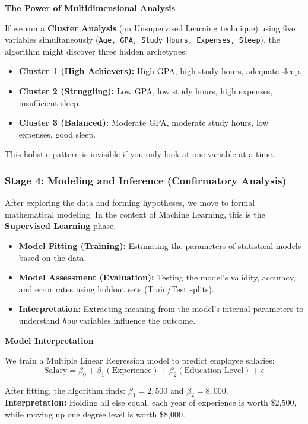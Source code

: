 \vspace{0.1cm}
\begin{example}{\textbf{The Power of Multidimensional Analysis}}

If we run a \textbf{Cluster Analysis} (an Unsupervised Learning technique) using five variables simultaneously (\texttt{Age, GPA, Study Hours, Expenses, Sleep}), the algorithm might discover three hidden archetypes:
\begin{itemize}
    \item \textbf{Cluster 1 (High Achievers):} High GPA, high study hours, adequate sleep.
    \item \textbf{Cluster 2 (Struggling):} Low GPA, low study hours, high expenses, insufficient sleep.
    \item \textbf{Cluster 3 (Balanced):} Moderate GPA, moderate study hours, low expenses, good sleep.
\end{itemize}
This holistic pattern is invisible if you only look at one variable at a time.
\end{example}

\subsubsection{Stage 4: Modeling and Inference (Confirmatory Analysis)}

After exploring the data and forming hypotheses, we move to formal mathematical modeling. In the context of Machine Learning, this is the \textbf{Supervised Learning} phase.

\begin{itemize}
    \item \textbf{Model Fitting (Training):} Estimating the parameters of statistical models based on the data.
    \item \textbf{Model Assessment (Evaluation):} Testing the model's validity, accuracy, and error rates using holdout sets (Train/Test splits).
    \item \textbf{Interpretation:} Extracting meaning from the model's internal parameters to understand \textit{how} variables influence the outcome.
\end{itemize}

\vspace{0.15cm}
\begin{example}{\textbf{Model Interpretation}}

We train a Multiple Linear Regression model to predict employee salaries:
$$ \text{Salary} = \beta_0 + \beta_1(\text{Experience}) + \beta_2(\text{Education\_Level}) + \epsilon $$

After fitting, the algorithm finds: $\beta_1 = 2{,}500$ and $\beta_2 = 8{,}000$. \\
\textbf{Interpretation:} Holding all else equal, each year of experience is worth \$2,500, while moving up one degree level is worth \$8,000.
\end{example}

